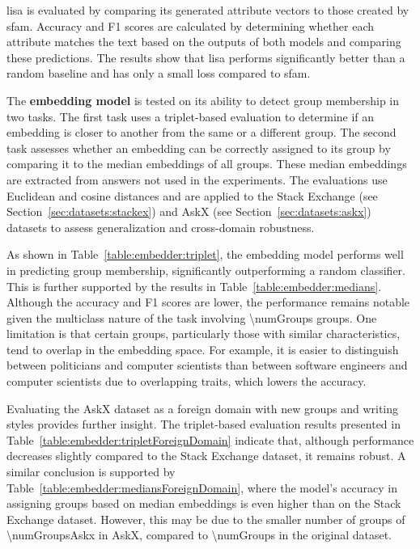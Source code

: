 \begin{table}[ht]
  \caption[]{\ac{lisa} is evaluated by comparing its generated attribute vectors to those created by \ac{sfam}. Accuracy and F1 scores are calculated by determining whether each attribute matches the text based on the outputs of both models and comparing these predictions. The results show that \ac{lisa} performs significantly better than a random baseline and has only a small loss compared to \ac{sfam}.}%
  \label{table:resultLISA}
  \centering
  \resultLisa{}
\end{table}

The \textbf{embedding model} is tested on its ability to detect group membership in two tasks. The first task uses a triplet-based evaluation to determine if an embedding is closer to another from the same or a different group. The second task assesses whether an embedding can be correctly assigned to its group by comparing it to the median embeddings of all groups. These median embeddings are extracted from answers not used in the experiments. The evaluations use Euclidean and cosine distances and are applied to the Stack Exchange (see Section~\ref{sec:datasets:stackex}) and AskX (see Section~\ref{sec:datasets:askx}) datasets to assess generalization and cross-domain robustness.

As shown in Table~\ref{table:embedder:triplet}, the embedding model performs well in predicting group membership, significantly outperforming a random classifier. This is further supported by the results in Table~\ref{table:embedder:medians}. Although the accuracy and F1 scores are lower, the performance remains notable given the multiclass nature of the task involving \num{\numGroups} groups. One limitation is that certain groups, particularly those with similar characteristics, tend to overlap in the embedding space. For example, it is easier to distinguish between politicians and computer scientists than between software engineers and computer scientists due to overlapping traits, which lowers the accuracy.

Evaluating the AskX dataset as a foreign domain with new groups and writing styles provides further insight. The triplet-based evaluation results presented in Table~\ref{table:embedder:tripletForeignDomain} indicate that, although performance decreases slightly compared to the Stack Exchange dataset, it remains robust. A similar conclusion is supported by Table~\ref{table:embedder:mediansForeignDomain}, where the model's accuracy in assigning groups based on median embeddings is even higher than on the Stack Exchange dataset. However, this may be due to the smaller number of groups of \num{\numGroupsAskx} in AskX, compared to \num{\numGroups} in the original dataset.

